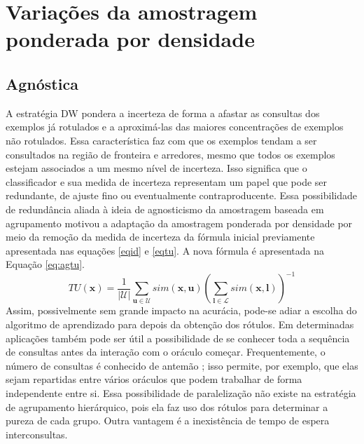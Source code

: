 \section{Variações da amostragem ponderada por densidade}


\subsection{Agnóstica}\label{ag}
A estratégia DW pondera a incerteza de forma a afastar as consultas
dos exemplos já rotulados e a aproximá-las das maiores concentrações de exemplos
não rotulados. Essa característica faz com que os exemplos tendam a ser consultados
na região de fronteira e arredores, mesmo que todos os exemplos
estejam associados a um mesmo nível de incerteza.
Isso significa que o classificador e sua medida de incerteza representam um papel que
pode ser redundante, de ajuste fino ou eventualmente contraproducente.
Essa possibilidade de redundância aliada à ideia de agnosticismo da amostragem baseada
em agrupamento motivou a adaptação da amostragem ponderada por densidade por meio
da remoção da medida de incerteza da fórmula inicial previamente apresentada
nas equações \ref{eqid} e \ref{eqtu}.
A nova fórmula é apresentada na Equação \ref{eq:agtu}.
\begin{equation}\label{eq:agtu}
 TU(\bm{x}) =
 \frac{1}{|\mathcal{U}|} \sum_{\bm{u} \in \mathcal{U}} sim(\bm{x},\bm{u})
 (\sum_{\bm{l} \in \mathcal{L}} sim(\bm{x},\bm{l}))^{-1}
\end{equation}
Assim, possivelmente sem grande impacto na acurácia,
pode-se adiar a escolha do algoritmo de aprendizado para depois da obtenção dos rótulos.
Em determinadas aplicações também pode ser útil a possibilidade de se conhecer toda
a sequência de consultas antes da interação com o oráculo começar.
Frequentemente, o número de consultas é conhecido de antemão \citep{settles2010active};
isso permite, por exemplo, que elas sejam repartidas entre vários oráculos que podem
trabalhar de forma independente entre si.
Essa possibilidade de paralelização não existe na estratégia de agrupamento hierárquico,
pois ela faz uso dos rótulos para determinar a pureza de cada grupo.
Outra vantagem é a inexistência de tempo de espera interconsultas.


